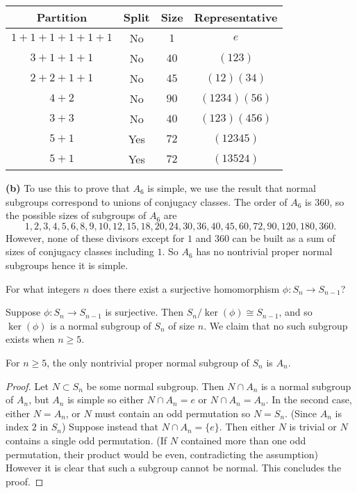 \documentclass[11pt,letterpaper]{article}
\begin{document}
\setlength{\tabcolsep}{20pt}
\renewcommand{\arraystretch}{1.5}
\begin{center}
  \begin{tabular}{ |c|c|c|c| } 
    \hline
    \textbf{Partition} & \textbf{Split} & \textbf{Size} & \textbf{Representative} \\ 
    \hline
    $1+1+1+1+1+1$ & No  & $1$ & $e$  \\ 
    \hline
    $3+1+1+1$ & No & $40$ & $(123)$ \\
    \hline
    $2+2+1+1$ & No & $45$ & $(12)(34)$  \\
    \hline
    $4+2$ & No & $90$ & $(1234)(56)$ \\
    \hline
    $3+3$ & No & $40$ & $(123)(456)$ \\
    \hline
    $5+1$ & Yes & $72$ & $(12345)$ \\
    \hline 
    $5+1$ & Yes & $72$ & $(13524)$ \\
    \hline
    \end{tabular}
\end{center}

\textbf{(b)} To use this to prove that $A_6$ is simple, we use the result that normal subgroups correspond to unions of conjugacy classes. The order of $A_6$ is $360$, so the possible sizes of subgroups of $A_6$ are 
\[
  1, 2, 3, 4, 5, 6, 8, 9, 10, 12, 15, 18, 20, 24, 30, 36, 40, 45, 60, 72, 90, 120, 180, 360
.\]  
However, none of these divisors except for $1$ and $360$ can be built as a sum of sizes of conjugacy classes including $1$. So $A_6$ has no nontrivial proper normal subgroups hence it is simple. 

\pagebreak
\begin{problem}
For what integers $n$ does there exist a surjective homomorphism $\phi : S_n \to S_{n-1}$?
\end{problem}

Suppose $\phi : S_n \to S_{n-1}$ is surjective. Then $S_n/\ker(\phi)\cong S_{n-1}$, and so $\ker(\phi)$ is a normal subgroup of $S_n$ of size $n$. We claim that no such subgroup exists when $n\geq 5$.

\begin{lemma}
  For $n\geq 5$, the only nontrivial proper normal subgroup of $S_n$ is $A_n$. 
\end{lemma}
\begin{proof}
  Let $N\subset S_n$ be some normal subgroup. Then $N\cap A_n$ is a normal subgroup of $A_n$, but $A_n$ is simple so either $N\cap A_n={e}$ or $N\cap A_n=A_n$. In the second case, either $N=A_n$, or $N$ must contain an odd permutation so $N=S_n$. (Since $A_n$ is index $2$ in $S_n$) Suppose instead that $N\cap A_n=\{e\}$. Then either $N$ is trivial or $N$ contains a single odd permutation. (If $N$ contained more than one odd permutation, their product would be even, contradicting the assumption) However it is clear that such a subgroup cannot be normal. This concludes the proof.      
\end{proof}
\end{document}
